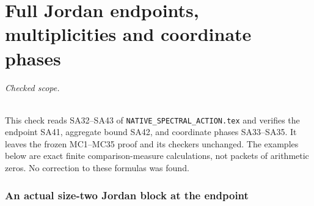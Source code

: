\endgroup

\clearpage\begingroup
\part*{Full Jordan endpoints, multiplicities and coordinate phases}
\newcommand{\saetr}{\operatorname{tr}}
\newcommand{\saeRes}{\operatorname{Res}}
\newcommand{\saeC}{\mathbb C}


\paragraph{Checked scope.}
This check reads SA32--SA43 of
\texttt{NATIVE\_SPECTRAL\_ACTION.tex} and verifies the endpoint
SA41, aggregate bound SA42, and coordinate phases SA33--SA35.
It leaves the frozen MC1--MC35 proof and its checkers unchanged.
The examples below are exact finite comparison-measure calculations,
not packets of arithmetic zeros. No correction to these formulas was found.

\section{An actual size-two Jordan block at the endpoint}

